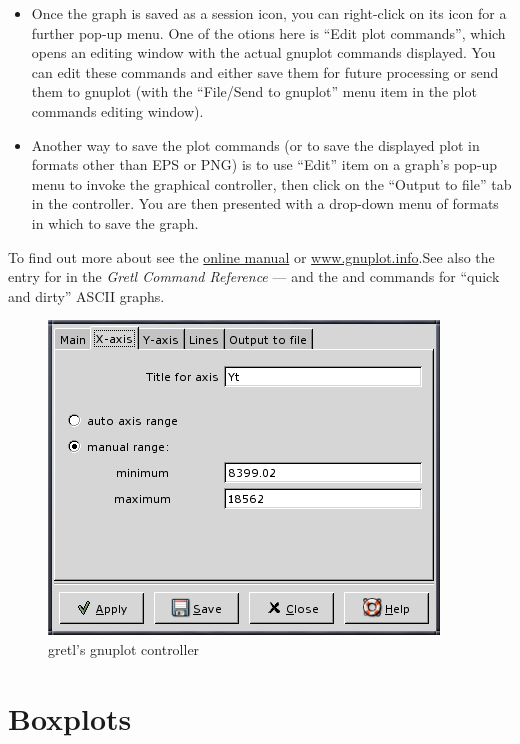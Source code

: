 \begin{itemize}
\item Once the graph is saved as a session icon, you can right-click
  on its icon for a further pop-up menu.  One of the otions here is
  ``Edit plot commands'', which opens an editing window with the
  actual gnuplot commands displayed. You can edit these commands and
  either save them for future processing or send them to gnuplot (with
  the ``File/Send to gnuplot'' menu item in the plot commands editing
  window).
\item Another way to save the plot commands (or to save the displayed
  plot in formats other than EPS or PNG) is to use ``Edit'' item on a
  graph's pop-up menu to invoke the graphical controller, then click
  on the ``Output to file'' tab in the controller.  You are then
  presented with a drop-down menu of formats in which to save the
  graph.
\end{itemize}

To find out more about  see the
\href{http://ricardo.ecn.wfu.edu/gnuplot.html}{online manual} or
\href{http://www.gnuplot.info/}{www.gnuplot.info}.See also the entry
for  in the \emph{Gretl Command Reference} --- and the
 and  commands for ``quick and dirty'' ASCII
graphs.

\begin{figure}[htbp]
  \caption{gretl's gnuplot controller}
  \label{fig-plot}
  \begin{center}
    \includegraphics[scale=0.5]{figures/plot_control}
  \end{center}
\end{figure}


\section{Boxplots}
\label{sect-boxplots}

